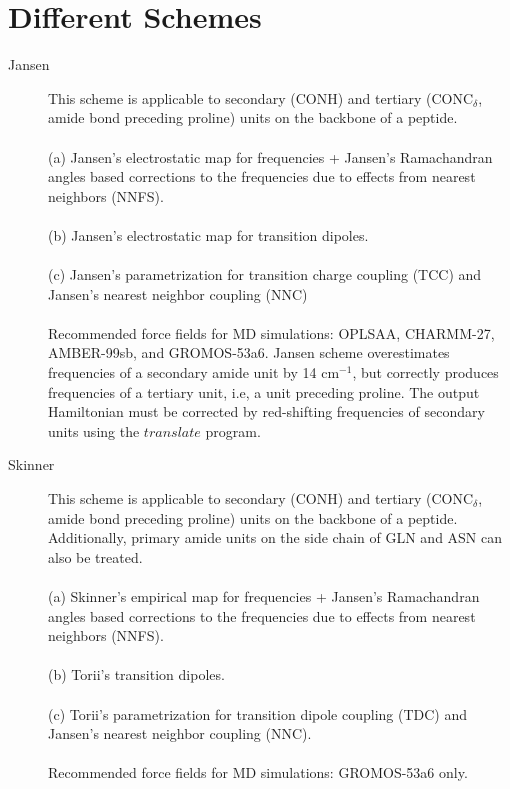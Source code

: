 \documentclass[12pt]{book}
\begin{document}
\section{Different Schemes}
\begin{description}
\item[Jansen]
This scheme is applicable to secondary (CONH)\cite{Jansen.2006.JCP.124.044502,Jansen.2006.JCP.125.044312} and tertiary (CONC$_{\delta}$, amide bond preceding proline\cite{Roy.2011.JCP.135.234507}) units on the backbone of a peptide.
\\\\
(a) Jansen's electrostatic map for frequencies + Jansen's Ramachandran angles based corrections to the frequencies due to effects from nearest neighbors (NNFS).
\\\\
(b) Jansen's electrostatic map for transition dipoles.
\\\\
(c) Jansen's parametrization for transition charge coupling (TCC) and Jansen's nearest neighbor coupling (NNC) 
\\\\
Recommended force fields for MD simulations: OPLSAA, CHARMM-27, AMBER-99sb, and GROMOS-53a6. Jansen scheme overestimates frequencies of a secondary amide unit by 14 cm$^{-1}$, but correctly produces frequencies of a tertiary unit, i.e, a unit preceding proline. The output Hamiltonian must be corrected by red-shifting frequencies of secondary units using the $translate$ program.

\item[Skinner]
This scheme is applicable to secondary (CONH)\cite{Wang.2011.JPCB.115.3713} and tertiary (CONC$_{\delta}$, amide bond preceding proline\cite{Roy.2011.JCP.135.234507}) units on the backbone of a peptide. Additionally, primary amide units on the side chain of GLN and ASN can also be treated.\cite{Wang.2011.JPCB.115.3713} 
\\\\
(a) Skinner's empirical map for frequencies\cite{Wang.2011.JPCB.115.3713} + Jansen's Ramachandran angles based corrections to the frequencies due to effects from nearest neighbors (NNFS).\cite{Jansen.2006.JCP.125.044312,Roy.2011.JCP.135.234507}
\\\\
(b) Torii's transition dipoles.\cite{Torii.1998.JRS.29.81}
\\\\
(c) Torii's parametrization for transition dipole coupling (TDC)\cite{Torii.1998.JRS.29.81} and Jansen's nearest neighbor coupling (NNC).\cite{Jansen.2006.JCP.125.044312,Roy.2011.JCP.135.234507} 
\\\\
Recommended force fields for MD simulations:  GROMOS-53a6 only.


\end{description}
\end{document}
